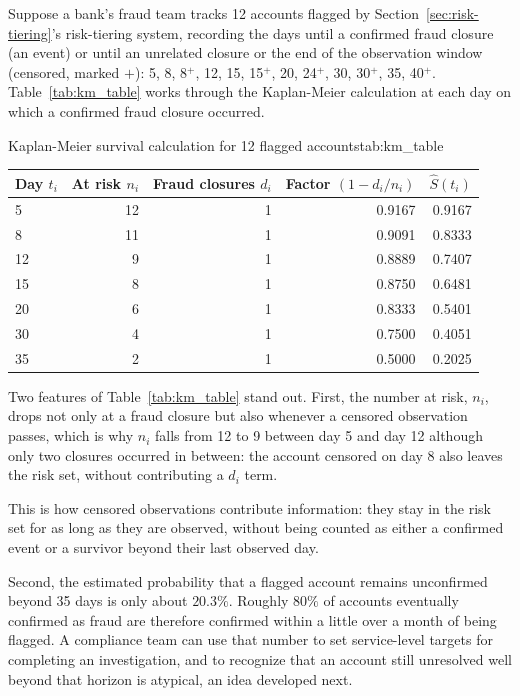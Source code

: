 \documentclass[../ai_in_finance]{subfiles}
\begin{document}
Suppose a bank's fraud team tracks 12 accounts flagged by Section~\ref{sec:risk-tiering}'s risk-tiering system, recording the days until a confirmed fraud closure (an event) or until an unrelated closure or the end of the observation window (censored, marked $+$): 5, 8, 8$^+$, 12, 15, 15$^+$, 20, 24$^+$, 30, 30$^+$, 35, 40$^+$. Table~\ref{tab:km_table} works through the Kaplan-Meier calculation at each day on which a confirmed fraud closure occurred.

\begin{booktable}[htbp]{Kaplan-Meier survival calculation for 12 flagged accounts}{tab:km_table}
\begin{tabular}{lrrrr}
\toprule
Day $t_i$ & At risk $n_i$ & Fraud closures $d_i$ & Factor $(1-d_i/n_i)$ & $\hat S(t_i)$ \\
\midrule
5  & 12 & 1 & 0.9167 & 0.9167 \\
8  & 11 & 1 & 0.9091 & 0.8333 \\
12 & 9  & 1 & 0.8889 & 0.7407 \\
15 & 8  & 1 & 0.8750 & 0.6481 \\
20 & 6  & 1 & 0.8333 & 0.5401 \\
30 & 4  & 1 & 0.7500 & 0.4051 \\
35 & 2  & 1 & 0.5000 & 0.2025 \\
\bottomrule
\end{tabular}
\end{booktable}

Two features of Table~\ref{tab:km_table} stand out. First, the number at risk, $n_i$, drops not only at a fraud closure but also whenever a censored observation passes, which is why $n_i$ falls from 12 to 9 between day 5 and day 12 although only two closures occurred in between: the account censored on day 8 also leaves the risk set, without contributing a $d_i$ term.

This is how censored observations contribute information: they stay in the risk set for as long as they are observed, without being counted as either a confirmed event or a survivor beyond their last observed day.

Second, the estimated probability that a flagged account remains unconfirmed beyond 35 days is only about $20.3\%$. Roughly $80\%$ of accounts eventually confirmed as fraud are therefore confirmed within a little over a month of being flagged. A compliance team can use that number to set service-level targets for completing an investigation, and to recognize that an account still unresolved well beyond that horizon is atypical, an idea developed next.
\end{document}
